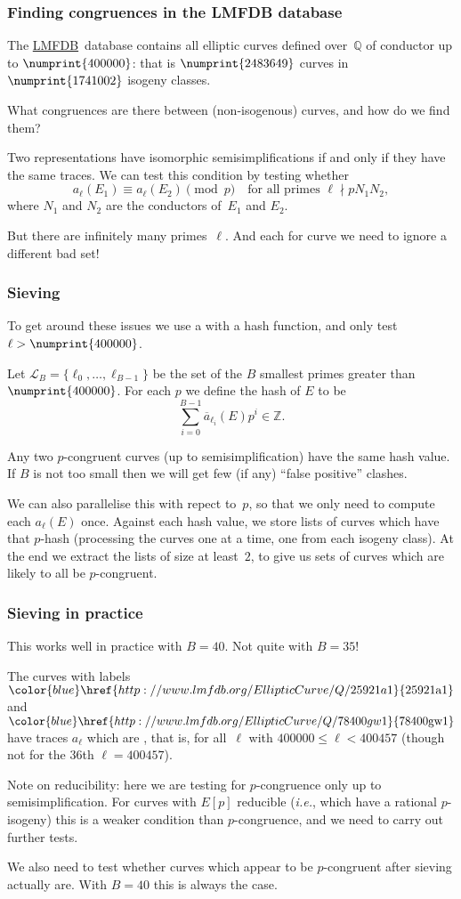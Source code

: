 \documentclass[compress]{beamer}
\newcommand{\Q}{\mathbb Q}
\newcommand{\Z}{\mathbb Z}
\newcommand{\LL}{\mathcal L}
\newcommand{\lmfdbec}[3]{\color{blue}\href{http://www.lmfdb.org/EllipticCurve/Q/#1#2#3}{{\text{\rm#1#2#3}}}}
\newcommand{\LMFDB}{\href{http://www.lmfdb.org/EllipticCurve/Q}{\color{blue}LMFDB}}
\newcommand{\high}[1]{\emph{\color{blue}{#1}}}
\begin{document}
\begin{frame}\frametitle{Finding congruences in the LMFDB database}
The \LMFDB\ database contains all elliptic curves defined over~$\Q$ of
conductor up to $\numprint{400000}$: that is $\numprint{2483649}$
curves in $\numprint{1741002}$ isogeny classes.

What congruences are there between (non-isogenous) curves, and how do
we find them?

Two representations have isomorphic semisimplifications if and only if
they have the same traces. We can test this condition by testing
whether
\[ a_{\ell}(E_1)\equiv a_{\ell}(E_2)\pmod{p}
\quad \text{for all primes } \ell \nmid pN_1N_2,
\] 
where $N_1$ and $N_2$ are the conductors of~$E_1$ and $E_2$.

But there are infinitely many primes~$\ell$.  And each for curve we need to
ignore a different bad set!
\end{frame}

\begin{frame}\frametitle{Sieving}
  To get around these issues we use a \high{sieve} with a hash
  function, and only test $\ell>\numprint{400000}$.

  Let $\LL_B=\{\ell_0,\dots,\ell_{B-1}\}$ be the set of the $B$
  smallest primes greater than $\numprint{400000}$.  For each $p$ we
  define the hash of $E$ to be
  \[\sum_{i=0}^{B-1}\overline{a}_{\ell_i}(E)p^i\in\Z.\]

 Any two $p$-congruent curves (up to semisimplification) have the same
 hash value.  If $B$ is not too small then we will get few (if any)
 ``false positive'' clashes.

  We can also parallelise this with repect to~$p$, so that we only
  need to compute each $a_{\ell}(E)$ once.  Against each hash value,
  we store lists of curves which have that $p$-hash (processing the
  curves one at a time, one from each isogeny class).  At the end we
  extract the lists of size at least~$2$, to give us sets of curves
  which are likely to all be $p$-congruent. %

\end{frame}

\begin{frame}\frametitle{Sieving in practice}
  This works well in practice with $B=40$. Not quite with $B=35$!

  \pause
  \medskip
  The curves with labels $\lmfdbec{25921}{a}{1}$ and
  $\lmfdbec{78400}{gw}{1}$ have traces $a_{\ell}$ which are \high{equal
    for all~$\ell\in\LL_{35}$}, that is, for all~$\ell$ with
  $400000\le \ell<400457$ (though not for the 36th $\ell=400457$).
  \pause
  \medskip

  Note on reducibility: here we are testing for $p$-congruence only up
  to semisimplification.  For curves with $E[p]$ reducible
  (\textit{i.e.}, which have a rational $p$-isogeny) this is a weaker
  condition than $p$-congruence, and we need to carry out further
  tests.

    \pause
  \medskip
  We also need to test whether curves which appear to be $p$-congruent
  after sieving actually are.  With $B=40$ this is always the case.
\end{frame}
\end{document}
